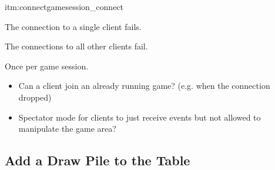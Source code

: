 \begin{description}
\begin{refenum}{itm:connectgamesession_connect}
    \item The connection to a single client fails.
    \item The connections to all other clients fail.
  \end{refenum}
  \item[Frquency of Occurrence:] Once per game session.
  \item[Miscellaneous:] \hfill
  \begin{itemize}
    \item Can a client join an already running game? (e.g. when the connection
    dropped)
    \item Spectator mode for clients to just receive events but not allowed to
    manipulate the game area?
  \end{itemize}
\end{description}

\subsection{Add a Draw Pile to the Table}

